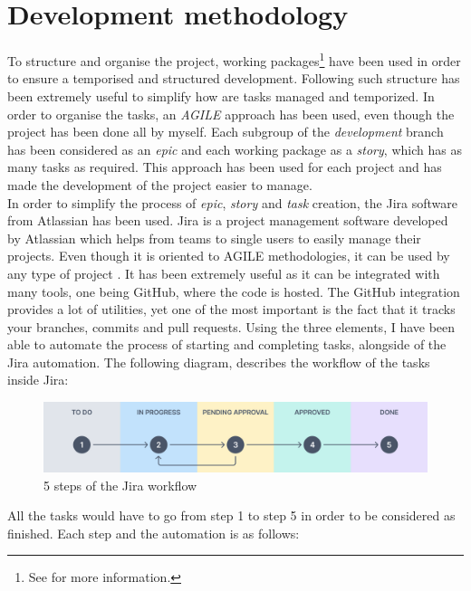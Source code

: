 \documentclass[a4paper, 12pt, oneside]{book}
\begin{document}
\section{Development methodology}
To structure and organise the project, working packages\footnote{See \emph{} for more information.} have been used in order to ensure a temporised and structured development. Following such structure has been extremely useful to simplify how are tasks managed and temporized. In order to organise the tasks, an \emph{AGILE} approach has been used, even though the project has been done all by myself. Each subgroup of the \emph{development} branch has been considered as an \emph{epic} and each working package as a \emph{story}, which has as many tasks as required. This approach has been used for each project and has made the development of the project easier to manage.
\\[8pt]
In order to simplify the process of \emph{epic}, \emph{story} and \emph{task} creation, the Jira software from Atlassian has been used. Jira is a project management software developed by Atlassian which helps from teams to single users to easily manage their projects. Even though it is oriented to AGILE methodologies, it can be used by any type of project \cite{jira}. It has been extremely useful as it can be integrated with many tools, one being GitHub, where the code is hosted. The GitHub integration provides a lot of utilities, yet one of the most important is the fact that it tracks your branches, commits and pull requests. Using the three elements, I have been able to automate the process of starting and completing tasks, alongside of the Jira automation. The following diagram, describes the workflow of the tasks inside Jira:
\begin{figure}[H]
	\centering
	\includegraphics[width=\textwidth]{assets/working-packages/JiraWorkflow.png}
	\caption{5 steps of the Jira workflow}
\end{figure}
All the tasks would have to go from step 1 to step 5 in order to be considered as finished. Each step and the automation is as follows:
\end{document}
